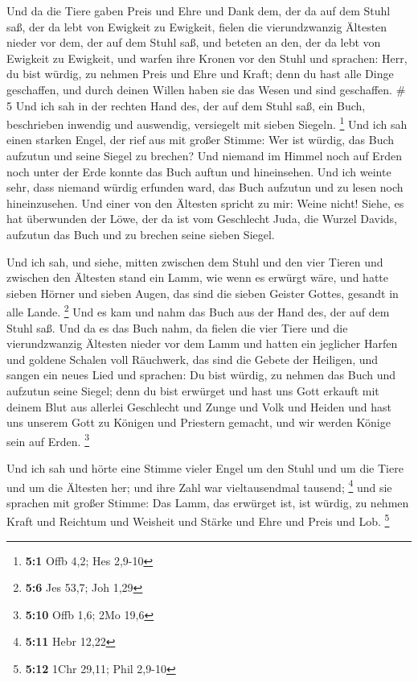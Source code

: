  Und da die Tiere gaben Preis und Ehre und Dank dem, der
da auf dem Stuhl saß, der da lebt von Ewigkeit zu Ewigkeit,
 fielen die vierundzwanzig Ältesten nieder vor dem, der
auf dem Stuhl saß, und beteten an den, der da lebt von Ewigkeit zu
Ewigkeit, und warfen ihre Kronen vor den Stuhl und sprachen:
 Herr, du bist würdig, zu nehmen Preis und Ehre und
Kraft; denn du hast alle Dinge geschaffen, und durch deinen Willen haben
sie das Wesen und sind geschaffen. \# 5  Und ich sah in
der rechten Hand des, der auf dem Stuhl saß, ein Buch, beschrieben
inwendig und auswendig, versiegelt mit sieben Siegeln. \footnote{\textbf{5:1}
  Offb 4,2; Hes 2,9-10}  Und ich sah einen starken Engel,
der rief aus mit großer Stimme: Wer ist würdig, das Buch aufzutun und
seine Siegel zu brechen?  Und niemand im Himmel noch auf
Erden noch unter der Erde konnte das Buch auftun und hineinsehen.
 Und ich weinte sehr, dass niemand würdig erfunden ward,
das Buch aufzutun und zu lesen noch hineinzusehen.  Und
einer von den Ältesten spricht zu mir: Weine nicht! Siehe, es hat
überwunden der Löwe, der da ist vom Geschlecht Juda, die Wurzel Davids,
aufzutun das Buch und zu brechen seine sieben Siegel.

 Und ich sah, und siehe, mitten zwischen dem Stuhl und den
vier Tieren und zwischen den Ältesten stand ein Lamm, wie wenn es
erwürgt wäre, und hatte sieben Hörner und sieben Augen, das sind die
sieben Geister Gottes, gesandt in alle Lande. \footnote{\textbf{5:6} Jes
  53,7; Joh 1,29}  Und es kam und nahm das Buch aus der
Hand des, der auf dem Stuhl saß.  Und da es das Buch nahm,
da fielen die vier Tiere und die vierundzwanzig Ältesten nieder vor dem
Lamm und hatten ein jeglicher Harfen und goldene Schalen voll Räuchwerk,
das sind die Gebete der Heiligen,  und sangen ein neues
Lied und sprachen: Du bist würdig, zu nehmen das Buch und aufzutun seine
Siegel; denn du bist erwürget und hast uns Gott erkauft mit deinem Blut
aus allerlei Geschlecht und Zunge und Volk und Heiden 
und hast uns unserem Gott zu Königen und Priestern gemacht, und wir
werden Könige sein auf Erden. \footnote{\textbf{5:10} Offb 1,6; 2Mo 19,6}

 Und ich sah und hörte eine Stimme vieler Engel um den
Stuhl und um die Tiere und um die Ältesten her; und ihre Zahl war
vieltausendmal tausend; \footnote{\textbf{5:11} Hebr 12,22}
 und sie sprachen mit großer Stimme: Das Lamm, das
erwürget ist, ist würdig, zu nehmen Kraft und Reichtum und Weisheit und
Stärke und Ehre und Preis und Lob. \footnote{\textbf{5:12} 1Chr 29,11;
  Phil 2,9-10}

